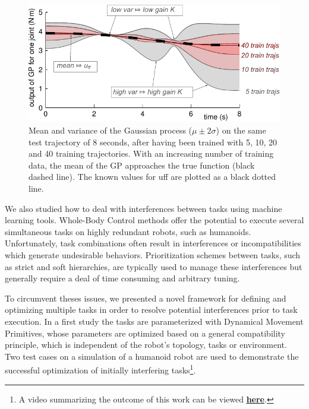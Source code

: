 \documentclass[final,5p,twocolumn]{elsarticle}
\begin{document}
\begin{figure}
  \centering
  \includegraphics[width=\linewidth]{images/meanvariance.pdf}
  \caption{Mean and variance of the Gaussian process ($\mu \pm 2\sigma$) on
    the same test trajectory of 8 seconds, after having been trained with 5,
    10, 20 and 40 training trajectories. With an increasing number of training
    data, the mean of the GP approaches the true function (black dashed
    line). The known values for uff are plotted as a black dotted line.}
  \label{fig:meanvariance}
\end{figure}

We also studied how to deal with interferences between tasks using
machine learning tools. Whole-Body Control methods offer the potential to
execute several simultaneous tasks on highly redundant robots, such as
humanoids. Unfortunately, task combinations often result in interferences or
incompatibilities which generate undesirable behaviors. Prioritization schemes
between tasks, such as strict and soft hierarchies, are typically used to manage
these interferences but generally require a deal of time consuming and arbitrary
tuning.

To circumvent theses issues, we presented a novel framework for defining and
optimizing multiple tasks in order to resolve potential interferences prior to
task execution. In a first study \cite{lober-HUMANOIDS2014} the tasks are
parameterized with Dynamical Movement Primitives, whose parameters are optimized
based on a general compatibility principle, which is independent of the robot's
topology, tasks or environment. Two test cases on a simulation of a humanoid
robot are used to demonstrate the successful optimization of initially interfering tasks\footnote{A video summarizing the outcome of this work can be viewed
\href{http://pages.isir.upmc.fr/~padois/website/fichiers/videos/lober_Humanoids2014.mp4}{\textbf{\underline{here}}}.}.\\
\end{document}
